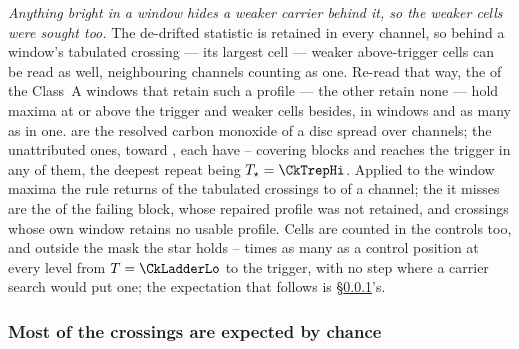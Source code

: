 \emph{Anything bright in a window hides a weaker carrier behind it, so the
weaker cells were sought too.} The de-drifted statistic is retained in every
channel, so behind a window's tabulated crossing --- its largest cell ---
weaker above-trigger cells can be read as well, neighbouring channels counting
as one. Re-read that way, the
\CkNWin{} of the \NWinA{} Class~A windows that retain such a profile --- the
other \CkNWinNotCov{} retain none --- hold \CkNPrimary{} maxima at or above
the trigger and \CkNSecondaryWord{} weaker cells besides,
in \CkNSecWin{} windows and as many as
\CkNSecMax{} in one. \CkNSecAttr{} are the resolved carbon monoxide of a disc
spread over channels; the \CkNSecUnattrWord{} unattributed ones, toward
\CkSecStars, each have \CkCovLo--\CkCovHi{} covering blocks and
\CkNRecurWord{} reaches the trigger in any of them, the deepest repeat being
$T_\star=\CkTrepHi$. Applied to the window maxima the
rule returns \CkRegN{} of the \EvNCrossRaw{} tabulated crossings to
\CkRegDev{} of a channel; the \CkRegMiss{} it misses are the \EvNCrossFlag{}
of the failing block, whose repaired profile was not retained, and crossings
whose own window retains no usable profile.
Cells are counted in the controls too, and outside the mask the star holds
\CkRatioLo--\CkRatioHi{} times as many as a control position at every level
from $T=\CkLadderLo$ to the trigger, with no step where a carrier search would
put one; the expectation that follows is \S\ref{sec:trigunif}'s.

\subsubsection{Most of the crossings are expected by chance}
\label{sec:trigunif}

